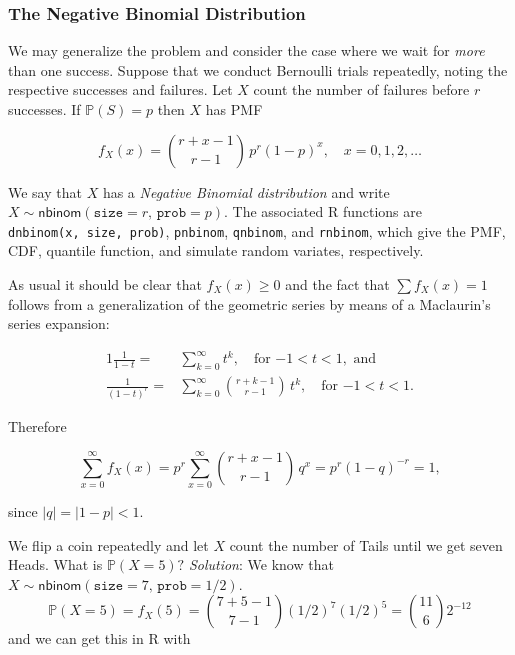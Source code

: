 \documentclass[]{book}
\numberwithin{equation}{chapter}
\numberwithin{figure}{chapter}
\theoremstyle{plain}
\theoremstyle{definition}
\theoremstyle{remark}
\theoremstyle{definition}
\theoremstyle{definition}
\theoremstyle{remark}
\let\BeginKnitrBlock\begin \let\EndKnitrBlock\end
\begin{document}
\subsubsection{The Negative Binomial
Distribution}\label{sub-the-negative-binomial}

We may generalize the problem and consider the case where we wait for
\emph{more} than one success. Suppose that we conduct Bernoulli trials
repeatedly, noting the respective successes and failures. Let \(X\)
count the number of failures before \(r\) successes. If
\(\mathbb{P}(S)=p\) then \(X\) has PMF

\begin{equation}
f_{X}(x)={r+x-1 \choose r-1}\, p^{r}(1-p)^{x},\quad x=0,1,2,\ldots
\end{equation}

We say that \(X\) has a \emph{Negative Binomial distribution} and write
\(X\sim\mathsf{nbinom}(\mathtt{size}=r,\,\mathtt{prob}=p)\). The
associated R functions are \texttt{dnbinom(x,\ size,\ prob)},
\texttt{pnbinom}, \texttt{qnbinom}, and \texttt{rnbinom}, which give the
PMF, CDF, quantile function, and simulate random variates, respectively.

As usual it should be clear that \(f_{X}(x)\geq 0\) and the fact that
\(\sum f_{X}(x)=1\) follows from a generalization of the geometric
series by means of a Maclaurin's series expansion:

\begin{alignat}{1}
\frac{1}{1-t}= & \sum_{k=0}^{\infty}t^{k},\quad \mbox{for \(-1 < t < 1\)},\mbox{ and}\\
\frac{1}{(1-t)^{r}}= & \sum_{k=0}^{\infty}{r+k-1 \choose r-1}\, t^{k},\quad \mbox{for \(-1 < t < 1\)}.
\end{alignat}

Therefore

\begin{equation}
\sum_{x=0}^{\infty}f_{X}(x)=p^{r}\sum_{x=0}^{\infty}{r+x-1 \choose r-1}\, q^{x}=p^{r}(1-q)^{-r}=1,
\end{equation}

since \(|q|=|1-p|<1\).

\bigskip

\BeginKnitrBlock{example}
\protect\hypertarget{ex:unnamed-chunk-236}{}{\label{ex:unnamed-chunk-236}}We
flip a coin repeatedly and let \(X\) count the number of Tails until we
get seven Heads. What is \(\mathbb{P}(X=5)?\) \emph{Solution}: We know
that \(X\sim\mathsf{nbinom}(\mathtt{size}=7,\,\mathtt{prob}=1/2)\).\\
\[
\mathbb{P}(X=5)=f_{X}(5)={7+5-1 \choose 7-1}(1/2)^{7}(1/2)^{5}={11
\choose 6}2^{-12} 
\] and we can get this in R with
\EndKnitrBlock{example}
\end{document}
